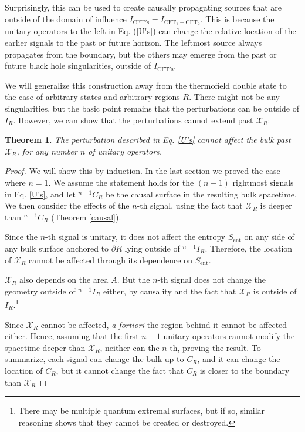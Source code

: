 \documentclass[12pt]{article}
\newtheorem{thm}{Theorem}[section]
\theoremstyle{remark}
\numberwithin{equation}{section}
\numberwithin{equation}{section}
\begin{document}
Surprisingly, this can be used to create causally propagating sources that are outside of the domain of influence $I_\mathrm{CFT's} = I_{\mathrm{CFT}_1 + \mathrm{CFT}_2}$.  This is because the unitary operators to the left in Eq. (\ref{U's}) can change the relative location of the earlier signals to the past or future horizon.  The leftmost source always propagates from the boundary, but the others may emerge from the past or future black hole singularities, outside of $I_\mathrm{CFT's}$.

We will generalize this construction away from the thermofield double state to the case of arbitrary states and arbitrary regions $R$.  There might not be any singularities, but the basic point remains that the perturbations can be outside of $I_R$.  However, we can show that the perturbations cannot extend past $\mathcal{X}_{R}$:

\begin{thm}
The perturbation described in Eq. \ref{U's} cannot affect the bulk past $\mathcal{X}_{R}$, for any number $n$ of unitary operators.
\end{thm}
\begin{proof}
We will show this by induction.  In the last section we proved the case where $n = 1$.  We assume the statement holds for the $(n-1)$ rightmost signals in Eq. \ref{U's}, and let \nolinebreak $^{n-1}C_R$ be the causal surface in the resulting bulk spacetime.  We then consider the effects of the $n$-th signal, using the fact that $\mathcal{X}_{R}$ is deeper than \nolinebreak $^{n-1}C_R$ (Theorem \ref{causal}). 

Since the $n$-th signal is unitary, it does not affect the entropy $S_\mathrm{ent}$ on any side of any bulk surface anchored to $\partial R$ lying outside of $^{n-1}I_R$.  Therefore, the location of $\mathcal{X}_{R}$ cannot be affected through its dependence on $S_\mathrm{ent}$.  

$\mathcal{X}_{R}$ also depends on the area $A$.  But the $n$-th signal does not change the geometry outside of \nolinebreak $^{n-1}I_R$ either, by causality and the fact that $\mathcal{X}_{R}$ is outside of $I_R$.\footnote{There may be multiple quantum extremal surfaces, but if so, similar reasoning shows that they cannot be created or destroyed.}

Since $\mathcal{X}_{R}$ cannot be affected, \emph{a fortiori} the region behind it cannot be affected either.  Hence, assuming that the first $n-1$ unitary operators cannot modify the spacetime deeper than $\mathcal{X}_{R}$, neither can the $n$-th, proving the result.  To summarize, each signal can change the bulk up to $C_R$, and it can change the location of $C_R$, but it cannot change the fact that $C_R$ is closer to the boundary than $\mathcal{X}_{R}$
\end{proof}
\end{document}
